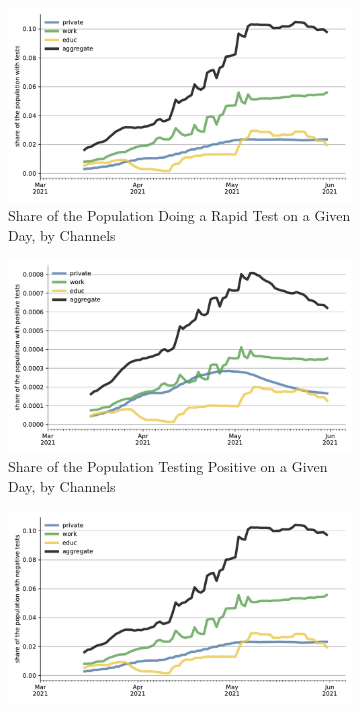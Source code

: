 \begin{figure}[ht] %
    \centering
    \begin{subfigure}[b]{0.3\textwidth}
        \includegraphics[width=\textwidth]{figures/results/figures/rapid_test_statistics/popshare_tested}
        \caption{Share of the Population Doing a Rapid Test on a Given Day, by Channels}
        \label{fig:rapid_test_demand_by_channel}
    \end{subfigure}
    \hfill
    \begin{subfigure}[b]{0.3\textwidth}
        \includegraphics[width=\textwidth]{figures/results/figures/rapid_test_statistics/popshare_tested_positive}
        \caption{Share of the Population Testing Positive on a Given Day, by Channels}
        \label{fig:pos_rapid_tests_by_channel}
    \end{subfigure}
    \hfill
    \begin{subfigure}[b]{0.3\textwidth}
        \includegraphics[width=\textwidth]{figures/results/figures/rapid_test_statistics/popshare_tested_negative}

\end{subfigure}
\end{figure}
